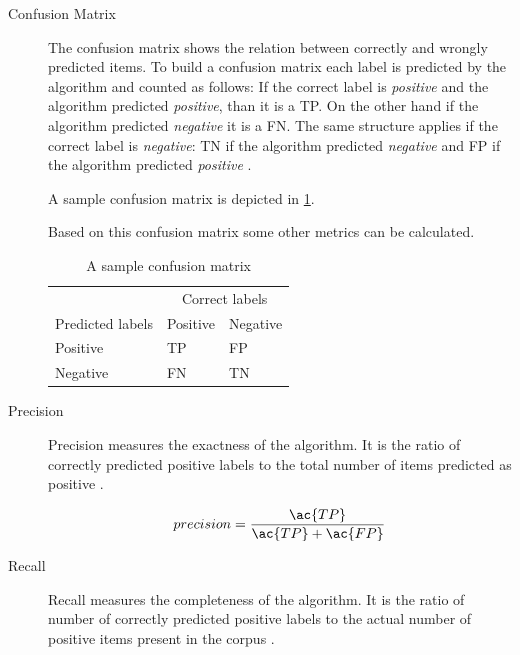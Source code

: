 \begin{description}
	\item [Confusion Matrix]
		The confusion matrix shows the relation between correctly and wrongly predicted items.
		To build a confusion matrix each label is predicted by the algorithm and counted as follows:
		If the correct label is \emph{positive} and the algorithm predicted \emph{positive}, than it is a \ac{TP}.
		On the other hand if the algorithm predicted \emph{negative} it is a \ac{FN}.
		The same structure applies if the correct label is \emph{negative}: \ac{TN} if the algorithm predicted \emph{negative} and \ac{FP} if the algorithm predicted \emph{positive}
		\citep{Tripathy2015}.

		A sample confusion matrix is depicted in \cref{tab:background-optionmining-confusionmatrix}.

		Based on this confusion matrix some other metrics can be calculated.
		
		\begin{table}
			\begin{center}
				\begin{tabular}{l | l l}
					 & \multicolumn{2}{c}{Correct labels} \\
					Predicted labels & Positive & Negative \\ \hline
					Positive & \ac{TP} & \ac{FP} \\
					Negative & \ac{FN} & \ac{TN} \\ \hline					
				\end{tabular}
		
				\caption{A sample confusion matrix}
				\label{tab:background-optionmining-confusionmatrix}
			\end{center}
		\end{table}

	\item [Precision]
		Precision measures the exactness of the algorithm.
		It is the ratio of correctly predicted positive labels to the total number of items predicted as positive
		\citep{Tripathy2015}.

		\begin{equation}
			precision = \frac{\ac{TP}}{\ac{TP}+\ac{FP}}
			\label{eq:background-optionmining-metrics-precision}
		\end{equation}

	\item [Recall]
		Recall measures the completeness of the algorithm.
		It is the ratio of number of correctly predicted positive labels to the actual number of positive items present in the corpus
		\citep{Tripathy2015}.


\end{description}
